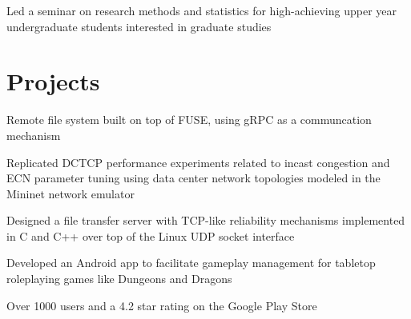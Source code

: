 \documentclass[]{chowes-resume}
\begin{document}
\begin{minipage}[t]{0.66\textwidth}
\begin{tightemize}
\item Led a seminar on research methods and statistics for high-achieving upper year undergraduate students interested in graduate studies
\end{tightemize}
\sectionsep


\section{Projects}

\begin{tightemize}
\item Remote file system built on top of FUSE, using gRPC as a communcation mechanism
\end{tightemize}
\sectionsep

\begin{tightemize}
\item Replicated DCTCP performance experiments related to incast congestion and ECN parameter tuning using data center network topologies modeled in the Mininet network emulator
\end{tightemize}
\sectionsep

\begin{tightemize}
\item Designed a file transfer server with TCP-like reliability mechanisms implemented in C and C++ over top of the Linux UDP socket interface
\end{tightemize}
\sectionsep

\begin{tightemize}
\item Developed an Android app to facilitate gameplay management for tabletop roleplaying games like Dungeons and Dragons
\item Over 1000 users and a 4.2 star rating on the Google Play Store
\end{tightemize}
\sectionsep

\end{minipage} 
\end{document}

